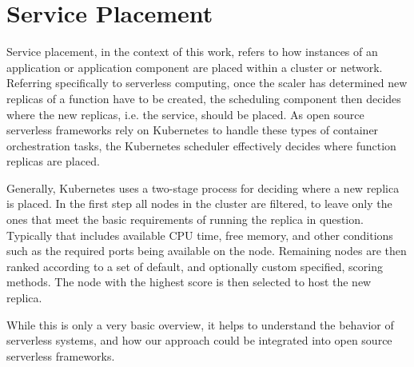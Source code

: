\section{Service Placement}
Service placement, in the context of this work, refers to how instances of an application or application component are placed within a cluster or network.
Referring specifically to serverless computing, once the scaler has determined new replicas of a function have to be created, the scheduling component then decides where the new replicas, i.e. the service, should be placed.
As open source serverless frameworks rely on Kubernetes to handle these types of container orchestration tasks\cite{mohantyEvaluationOpenSource2018}, the Kubernetes scheduler effectively decides where function replicas are placed.

Generally, Kubernetes uses a two-stage process for deciding where a new replica is placed.
In the first step all nodes in the cluster are filtered, to leave only the ones that meet the basic requirements of running the replica in question.
Typically that includes available CPU time, free memory, and other conditions such as the required ports being available on the node.
Remaining nodes are then ranked according to a set of default, and optionally custom specified, scoring methods.
The node with the highest score is then selected to host the new replica.

While this is only a very basic overview, it helps to understand the behavior of serverless systems, and how our approach could be integrated into open source serverless frameworks.
